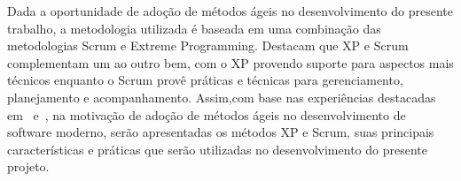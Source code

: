Dada a oportunidade de adoção de métodos ágeis no desenvolvimento do presente trabalho, a 
metodologia utilizada é baseada em uma combinação das metodologias Scrum e Extreme Programming. Destacam que XP e Scrum complementam um ao outro bem, com o XP provendo suporte para aspectos mais técnicos enquanto o Scrum provê práticas e técnicas para gerenciamento, planejamento e acompanhamento. Assim,com base nas experiências destacadas em~\cite{schwaber2001} e~\cite{fitzgerald2006}, na motivação de adoção de métodos ágeis no desenvolvimento de software moderno, serão apresentadas os métodos XP e Scrum, suas principais características e práticas que serão utilizadas no desenvolvimento do presente projeto.
